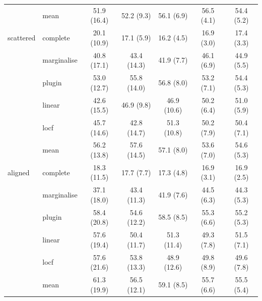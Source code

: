 \begin{table}[htbp]
\begin{tabular}{llccccc}
     & mean & 51.9 (16.4) & 52.2 (9.3) & 56.1 (6.9) & 56.5 (4.1) & 54.4 (5.2) \\
    \addlinespace
    scattered & complete & 20.1 (10.9) & 17.1 (5.9) & 16.2 (4.5) & 16.9 (3.0) & 17.4 (3.3) \\
     & marginalise & 40.8 (17.1) & 43.4 (14.3) & 41.9 (7.7) & 46.1 (6.9) & 44.9 (5.5) \\
     & plugin & 53.0 (12.7) & 55.8 (14.0) & 56.8 (8.0) & 53.2 (7.1) & 54.4 (5.3) \\
     & linear & 42.6 (15.5) & 46.9 (9.8) & 46.9 (10.6) & 50.2 (6.4) & 51.0 (5.9) \\
     & locf & 45.7 (14.6) & 42.8 (14.7) & 51.3 (10.8) & 50.2 (7.9) & 50.4 (7.1) \\
     & mean & 56.2 (13.8) & 57.6 (14.5) & 57.1 (8.0) & 53.6 (7.0) & 54.6 (5.3) \\
    \addlinespace
    aligned & complete & 18.3 (11.5) & 17.7 (7.7) & 17.3 (4.8) & 16.9 (3.1) & 16.9 (2.5) \\
     & marginalise & 37.1 (18.0) & 43.4 (11.3) & 41.9 (7.6) & 44.5 (6.3) & 44.3 (5.3) \\
     & plugin & 58.4 (20.8) & 54.6 (12.2) & 58.5 (8.5) & 55.3 (6.6) & 55.2 (5.3) \\
     & linear & 57.6 (19.4) & 50.4 (11.7) & 51.3 (11.4) & 49.3 (7.8) & 51.5 (7.1) \\
     & locf & 57.6 (21.6) & 53.8 (13.3) & 48.9 (12.6) & 49.8 (8.9) & 49.6 (7.8) \\
     & mean & 61.3 (19.9) & 56.5 (12.1) & 59.1 (8.5) & 55.7 (6.6) & 55.5 (5.4) \\
    \bottomrule
  \end{tabular}
\end{table}
